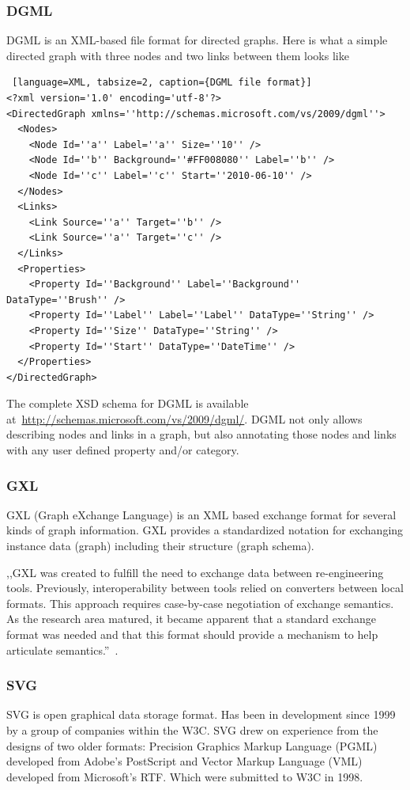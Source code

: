 \subsubsection{DGML}
DGML is an XML-based file format for directed graphs. Here is what a simple directed graph with three nodes and two links between them looks like

\begin{center}
\begin{lstlisting} [language=XML, tabsize=2, caption={DGML file format}]
<?xml version='1.0' encoding='utf-8'?>
<DirectedGraph xmlns=''http://schemas.microsoft.com/vs/2009/dgml''>
  <Nodes>
    <Node Id=''a'' Label=''a'' Size=''10'' />
    <Node Id=''b'' Background=''#FF008080'' Label=''b'' />
    <Node Id=''c'' Label=''c'' Start=''2010-06-10'' />
  </Nodes>
  <Links>
    <Link Source=''a'' Target=''b'' />
    <Link Source=''a'' Target=''c'' />
  </Links>
  <Properties>
    <Property Id=''Background'' Label=''Background'' DataType=''Brush'' />
    <Property Id=''Label'' Label=''Label'' DataType=''String'' />
    <Property Id=''Size'' DataType=''String'' />
    <Property Id=''Start'' DataType=''DateTime'' />
  </Properties>
</DirectedGraph>
\end{lstlisting}
\end{center}

The complete XSD schema for DGML is available at~\url{http://schemas.microsoft.com/vs/2009/dgml/}. DGML not only allows describing nodes and links in a graph, but also annotating those nodes and links with any user defined property and/or category.

\subsubsection{GXL}
GXL (Graph eXchange Language) is an XML based exchange format for several kinds of graph information. GXL provides a standardized notation for exchanging instance data (graph) including their structure (graph schema).

,,GXL was created to fulfill the need to exchange data between re-engineering tools. Previously, interoperability between tools relied on converters between local formats. This approach requires case-by-case negotiation of exchange semantics. As the research area matured, it became apparent that a standard exchange format was needed and that this format should provide a mechanism to help articulate semantics.''~\cite{GXL}.

\subsubsection{SVG}
SVG is open graphical data storage format. Has been in development since 1999 by a group of companies within the W3C. SVG drew on experience from the designs of two older formats: Precision Graphics Markup Language (PGML) developed from Adobe's PostScript and Vector Markup Language (VML) developed from Microsoft's RTF. Which were submitted to W3C in 1998.


